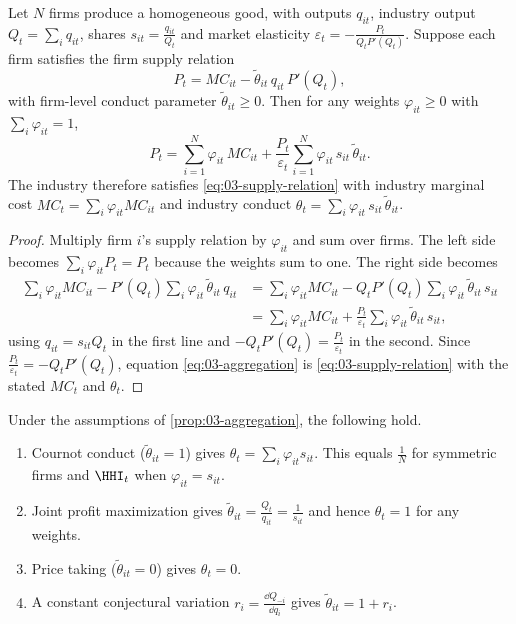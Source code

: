 \begin{proposition}\label{prop:03-aggregation}
Let $N$ firms produce a homogeneous good, with outputs $q_{it}$, industry output $Q_t = \sum_i q_{it}$, shares
$s_{it} = \frac{q_{it}}{Q_t}$ and market elasticity $\varepsilon_t = -\frac{P_t}{Q_t P'(Q_t)}$. Suppose each firm
satisfies the firm supply relation
\begin{equation*}
P_t = MC_{it} - \tilde\theta_{it}\, q_{it}\, P'(Q_t),
\end{equation*}
with firm-level conduct parameter $\tilde\theta_{it} \ge 0$. Then for any weights $\varphi_{it} \ge 0$ with
$\sum_i \varphi_{it} = 1$,
\begin{equation}\label{eq:03-aggregation}
P_t = \sum_{i=1}^{N} \varphi_{it}\, MC_{it} + \frac{P_t}{\varepsilon_t}\sum_{i=1}^{N} \varphi_{it}\, s_{it}\,
\tilde\theta_{it}.
\end{equation}
The industry therefore satisfies \eqref{eq:03-supply-relation} with industry marginal cost
$MC_t = \sum_i \varphi_{it} MC_{it}$ and industry conduct $\theta_t = \sum_i \varphi_{it}\, s_{it}\,\tilde\theta_{it}$.
\end{proposition}

\begin{proof}
Multiply firm $i$'s supply relation by $\varphi_{it}$ and sum over firms. The left side becomes
$\sum_i \varphi_{it} P_t = P_t$ because the weights sum to one. The right side becomes
\begin{align*}
\sum_i \varphi_{it} MC_{it} - P'(Q_t) \sum_i \varphi_{it}\,\tilde\theta_{it}\, q_{it}
&= \sum_i \varphi_{it} MC_{it} - Q_t P'(Q_t) \sum_i \varphi_{it}\,\tilde\theta_{it}\, s_{it} \\
&= \sum_i \varphi_{it} MC_{it} + \frac{P_t}{\varepsilon_t} \sum_i \varphi_{it}\,\tilde\theta_{it}\, s_{it},
\end{align*}
using $q_{it} = s_{it} Q_t$ in the first line and $-Q_t P'(Q_t) = \frac{P_t}{\varepsilon_t}$ in the second. Since
$\frac{P_t}{\varepsilon_t} = -Q_t P'(Q_t)$, equation \eqref{eq:03-aggregation} is \eqref{eq:03-supply-relation} with
the stated $MC_t$ and $\theta_t$.
\end{proof}

\begin{corollary}\label{cor:03-benchmarks}
Under the assumptions of \cref{prop:03-aggregation}, the following hold.
\begin{enumerate}[label=(\roman*)]
\item Cournot conduct ($\tilde\theta_{it} = 1$) gives $\theta_t = \sum_i \varphi_{it} s_{it}$. This equals
  $\frac{1}{N}$ for symmetric firms and $\HHI_t$ when $\varphi_{it} = s_{it}$.
\item Joint profit maximization gives $\tilde\theta_{it} = \frac{Q_t}{q_{it}} = \frac{1}{s_{it}}$ and hence
  $\theta_t = 1$ for any weights.
\item Price taking ($\tilde\theta_{it} = 0$) gives $\theta_t = 0$.
\item A constant conjectural variation $r_i = \frac{\dd Q_{-i}}{\dd q_i}$ gives $\tilde\theta_{it} = 1 + r_i$.
\end{enumerate}
\end{corollary}

